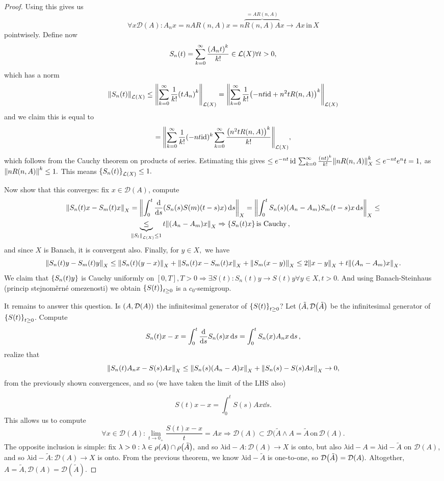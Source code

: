 \documentclass{article}
\begin{document}
\begin{proof}
Using this gives us
\[
	\forall x \mathcal{D}(A): A_n x = n AR(n,A)x = n \overbrace{R(n,A)A}^{=AR(n,A)}x \to Ax \, \text{in} \,X
\]
pointwisely. Define now
\[
	S_n(t) = \sum_{k=0}^{\infty}\frac{\qty(A_n t)^k}{k!} \in \mathcal{L}(X) \forall t>0,
\]
which has a norm
\[
	\norm{S_n(t)}_{\mathcal{L}(X)} \leq \norm{\sum_{k=0}^{\infty}\frac{1}{k!}\qty(tA_n)^k}_{\mathcal{L}(X)} = \norm{\sum_{k=0}^{\infty} \frac{1}{k!}\qty(-n t \text{id} + n^{2} t R(n,A))^k}_{\mathcal{L}(X)}
\]
and we claim this is equal to
\[
	= \norm{\sum_{k=0}^{\infty}\frac{1}{k!}(-n t \text{id})^k \sum_{k=0}^\infty \frac{\qty(n^{2} t R(n,A))^k}{k!}}_{\mathcal{L}(X)},
\]
which follows from the Cauchy theorem on products of series. Estimating this gives $ \leq e^{-nt}\, \text{id} \, \sum_{k=0}^{\infty}\frac{\qty(nt)^k}{k!}\norm{nR(n,A)}^k_X \leq e^{-nt} e^nt = 1,$ as $\norm{nR(n,A)}^k \leq 1.$ This means $\qty{S_n(t)}_{\mathcal{L}(X)} \leq 1.$

Now show that this converges: fix $x \in \mathcal{D}(A)$, compute
\begin{align*}
	\norm{S_n(t)x - S_m(t)x}_X &= \norm{\int_0^t \dv{s} \qty(S_n(s) S(m)(t-s)x)\dd{s}}_X = \norm{\int_0^t S_n(s)(A_n - A_m)S_m(t-s)x \dd{s}}_X \leq \\
				   &\underbrace{\leq}_{\norm{S_l}_{\mathcal{L}(X)}\leq 1} t\norm{(A_n - A_m)x}_X \Rightarrow \qty{S_n(t)x} \, \text{is Cauchy} \,,
\end{align*}
and since $X$ is Banach, it is convergent also. Finally, for $y \in X,$ we have
\[
	\norm{S_n(t)y - S_m(t)y}_X \leq \norm{S_n(t)(y-x)}_X + \norm{S_n(t)x - S_m(t)x}_X + \norm{S_m(x-y)}_X \leq 2 \norm{x-y}_X + t\norm{(A_n - A_m)x}_X.
\]
We claim that $\qty{S_n(t)y}$ is Cauchy uniformly on $[0,T], T > 0 \Rightarrow \exists S(t): S_n(t)y \to S(t)y \forall y \in X, t>0.$ And using Banach-Steinhaus (princip stejnoměrné omezenosti) we obtain $\qty{S(t)}_{t\geq 0}$ is a $c_0$-semigroup.

It remains to answer this question. Is $\qty(A, \mathcal{D}(A))$ the infinitesimal generator of $\qty{S(t)}_{t\geq 0}$? Let $(\tilde{A}, \mathcal{D}\qty(\tilde{A})$ be the infinitesimal generator of $\qty{S(t)}_{t\geq 0}$. Compute
\[
	S_n(t)x - x = \int_0^t \dv{s} S_n(s) x \dd{s} = \int_0^t S_n(x)A_n x \dd{s},
\]
realize that
\[
	\norm{S_n(t) A_n x - S(s) A x}_X \leq \norm{S_n(s)(A_n - A)x}_X + \norm{S_n(s)-S(s)Ax}_X \to 0,
\]
from the previously shown convergences, and so (we have taken the limit of the LHS also)

\[
	S(t)x -x = \int_0^t S(s)Ax \dd{s}.
\]
This allows us to compute
\[
	\forall x \in \mathcal{D}(A): \lim_{t\to 0_+}\frac{S(t)x- x}{t} = Ax \Rightarrow \mathcal{D}(A) \subset \mathcal{D}(\tilde{A} \wedge A = \tilde{A} \, \text{on} \, \mathcal{D}(A).
\]
The opposite inclusion is simple: fix $\lambda >0: \lambda \in \rho(A) \cap \rho\qty(\tilde{A}),$ and so $\lambda \text{id} - A: \mathcal{D}(A) \to X$ is onto, but also $\lambda \text{id} - A = \lambda \text{id} - \tilde{A}$ on $\mathcal{D}(A)$, and so $\lambda \text{id}-\tilde{A}: \mathcal{D}(A) \to X$ is onto. From the previous theorem, we know $\lambda \text{id} - \tilde{A}$ is one-to-one, so $\mathcal{D}\qty(\tilde{A}) = \mathcal{D}(A).$ Altogether, $A = \tilde{A}, \mathcal{D}(A) = \mathcal{D}(\tilde{A}).$



\end{proof}
\end{document}
